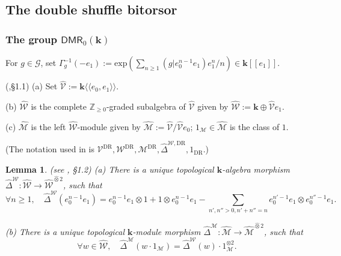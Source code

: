 \documentclass[10pt]{amsart}
\newcommand{\DR}{\mathrm{DR}}
\newtheorem{lem}[thm]{Lemma}
\numberwithin{equation}{subsection}
\begin{document}
\subsection{The double shuffle bitorsor}\label{sect:0:3}

\subsubsection{The group $\mathsf{DMR}_0(\mathbf k)$}

\begin{defn}
    For $g\in\mathcal G$, set $\Gamma_g^{-1}(-e_1):=\mathrm{exp}(\sum_{n\geq1}(g|e_0^{n-1}e_1)e_1^n/n)\in\mathbf k[[e_1]]$. 
\end{defn}


\begin{defn} \label{def:mrs:1608:BIS:BIS} (\cite{EF1},\S1.1)
(a) Set $\hat{\mathcal V}:=\mathbf k\langle\langle e_0,e_1\rangle\rangle$. 

(b) $\hat{\mathcal W}$ is the complete $\mathbb Z_{\geq 0}$-graded subalgebra of 
$\hat{\mathcal V}$ given by 
$\hat{\mathcal W}:=\mathbf k\oplus \hat{\mathcal V}e_1$. 

(c) $\hat{\mathcal M}$ is the left $\hat{\mathcal W}$-module given by 
$\hat{\mathcal M}:=\hat{\mathcal V}/\hat{\mathcal V}e_0$; $1_{\mathcal M}\in \hat{\mathcal M}$ is the class of $1$. 
\end{defn}
(The notation used in \cite{EF1} is $\mathcal V^\DR,\mathcal W^\DR,\mathcal M^\DR,\hat\Delta^{\mathcal W,\DR},1_\DR$.)

\begin{lem} (see \cite{EF1}, \S1.2)
(a) There is a unique topological $\mathbf  k$-algebra morphism $\hat\Delta^{\mathcal W} : 
\hat{\mathcal W}\to \hat{\mathcal W}^{\hat\otimes 2}$, such that  
\begin{equation}\label{pties:Delta:W}
   \textstyle \forall n\geq 1,\quad \hat\Delta^{\mathcal W}(e_0^{n-1}e_1)=e_0^{n-1}e_1\otimes1+1\otimes e_0^{n-1}e_1-\sum_{n',n''>0,n'+n''=n}e_0^{n'-1}e_1
    \otimes e_0^{n''-1}e_1.  
\end{equation}

(b) There is a unique topological $\mathbf k$-module morphism $\hat\Delta^{\mathcal M} : 
\hat{\mathcal M}\to \hat{\mathcal M}^{\hat\otimes 2}$, such that  
$$
\forall w\in\hat{\mathcal W},\quad \hat\Delta^{\mathcal M}(w\cdot 1_{\mathcal M})=\hat\Delta^{\mathcal W}(w)\cdot 1_{\mathcal M}^{\otimes2}. 
$$
\end{lem}
\end{document}

